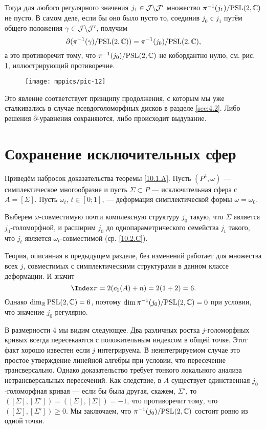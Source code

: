 Тогда для любого регулярного значения $j_1 \in \mathcal{J} \backslash \mathcal{J}'$ множество $\pi^{-1} (j_1)/\mathrm{PSL}(2, \mathbb{C})$ не пусто.
В самом деле, если бы оно было пусто то, соединив $j_0$ с $j_1$ путём общего положения $\gamma \in \mathcal{J} \backslash\mathcal{J}'$, получим
\[\partial(\pi^{-1}(\gamma)/\mathrm{PSL}(2,\mathbb{C}))
=
\pi^{-1}(j_0)/\mathrm{PSL}(2,\mathbb{C}),
\]
а это противоречит тому, что $\pi^{-1} (j_0)/\mathrm{PSL}(2, \mathbb{C})$ не кобордантно нулю, см. рис. \ref{pic-12}, иллюстрирующий противоречие.

\begin{figure}[ht!]
\vskip0mm
\centering
\texttt{[image: mppics/pic-12]}
\caption{}\label{pic-12}
\vskip0mm
\end{figure}

Это явление соответствует принципу продолжения, с которым мы уже сталкивались в
случае псевдоголоморфных дисков в разделе \ref{sec:4.2}. 
Либо решения $\bar\partial$-уравнения сохраняются, либо происходит выдувание.

\section{Сохранение исключительных сфер}

Приведём набросок доказательства теоремы \ref{10.1.A}.
Пусть $(P^4, \omega)$ — симплектическое многообразие и пусть $\Sigma \subset P$ — исключительная сфера с $A = [\Sigma]$.
Пусть $\omega_t$, $t \in [0;1]$, — деформация симплектической формы $\omega = \omega_0$.

Выберем $\omega$-совместимую почти комплексную структуру $j_0$ такую, что $\Sigma$ является $j_0$-голоморфной, и расширим $j_0$ до однопараметрического семейства $j_t$ такого, что $j_t$ является $\omega_t$-совместимой (ср. \ref{10.2.C}).

Теория, описанная в предыдущем разделе, без изменений работает для
множества всех $j$, совместимых с симплектическими структурами в
данном классе деформации. 
И значит
\[\Index\pi = 2(c_1 (A) + n) = 2(1 + 2) = 6.\]
Однако $\dim_{\mathbb{R}}\mathrm{PSL}(2, \mathbb{C}) = 6$, поэтому $\dim \pi^{-1}
(j_0)/\mathrm{PSL}(2, \mathbb{C}) = 0$ при условии, что значение $j_0$ регулярно. 

В размерности 4 мы видим следующее.
Два различных ростка $j$-голоморфных кривых всегда пересекаются с
положительным индексом в общей точке. 
Этот факт хорошо известен если $j$ интегрируема.
В неинтегрируемом случае это простое утверждение линейной алгебры при
условии, что пересечение трансверсально. 
Однако доказательство требует тонкого локального анализа
нетрансверсальных пересечений. 
Как следствие, в $A$ существует единственная $j_0$-голоморфная кривая
— если бы была другая, скажем, $\Sigma'$, то $([\Sigma], [\Sigma'])
= ([\Sigma], [\Sigma]) = -1$, что противоречит тому, что $([\Sigma],
[\Sigma']) \ge 0$. 
Мы заключаем, что $\pi^{-1} (j_0)/\mathrm{PSL}(2, \mathbb{C})$ состоит ровно из одной
точки. 

